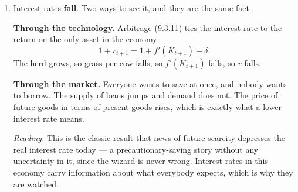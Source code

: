 \documentclass[12pt, letterpaper]{article}
\begin{document}
\begin{tcolorbox}[evenbox,title={Problem 9.10 \quad Wizards and Cows}]
\begin{enumerate}
\smallskip
Note the mechanism has nothing to do with the weather affecting cows: grass grows equally well in
cold and warm years, by assumption. The response is entirely intertemporal substitution driven by
foresight, and it would not exist without the wizard.

\item Interest rates \textbf{fall}. Two ways to see it, and they are the same fact.

\textbf{Through the technology.} Arbitrage (9.3.11) ties the interest rate to the return on the
only asset in the economy:
\[
1+r_{t+1}=1+f'(K_{t+1})-\delta .
\]
The herd grows, so grass per cow falls, so $f'(K_{t+1})$ falls, so $r$ falls.

\textbf{Through the market.} Everyone wants to save at once, and nobody wants to borrow. The
supply of loans jumps and demand does not. The price of future goods in terms of present goods
rises, which is exactly what a lower interest rate means.

\smallskip
\emph{Reading.} This is the classic result that news of future scarcity depresses the real
interest rate today --- a precautionary-saving story without any uncertainty in it, since the
wizard is never wrong. Interest rates in this economy carry information about what everybody
expects, which is why they are watched.
\end{enumerate}
\end{tcolorbox}
\end{document}
